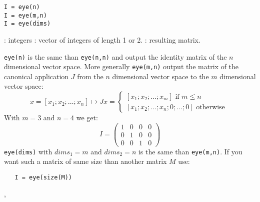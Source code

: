 \begin{mandesc}
\end{mandesc}
\begin{calling_sequence}
\begin{verbatim}
I = eye(n)
I = eye(m,n)
I = eye(dims)
\end{verbatim}
\end{calling_sequence}
\begin{parameters}
  \begin{varlist}
    : integers
    : vector of integers of length 1 or 2.
    : resulting matrix.
  \end{varlist}
\end{parameters}

\begin{mandescription}
\verb+eye(n)+ is the same than \verb+eye(n,n)+ and output the identity matrix of the $n$ dimensional
vector space. More generally \verb+eye(m,n)+ output the matrix of the canonical application $J$ from
the $n$ dimensional vector space to the  $m$ dimensional vector space: 
$$
x = \left[ x_1 ; x_2 ; \dots ; x_n \right]  \longmapsto  J x = 
\left\{ 
\begin{array}{l} 
     \left[ x_1 ; x_2 ; \dots ; x_m \right] \mbox{ if } m \le n \\ \left[ x_1 ; x_2 ; \dots ; x_n ; 0 ; \dots ; 0 \right] \mbox{ otherwise }
\end{array} 
\right.
$$
With $m=3$ and $n=4$ we get:
$$
    I = \left( \begin{array}{cccc} 1 & 0 & 0 & 0 \\ 0 & 1 & 0 & 0 \\ 0 & 0 & 1 & 0
      \end{array} \right)
$$
\verb+eye(dims)+ with $dims_1 = m$ and $dims_2 = n$ is the same than  \verb+eye(m,n)+. If you want
such a matrix of same size than another matrix $M$ use: 
\begin{verbatim}
   I = eye(size(M))
\end{verbatim}

\end{mandescription}


\begin{examples}
\begin{program}
\end{program} 

\end{examples}

\begin{manseealso}
, 
\end{manseealso}

